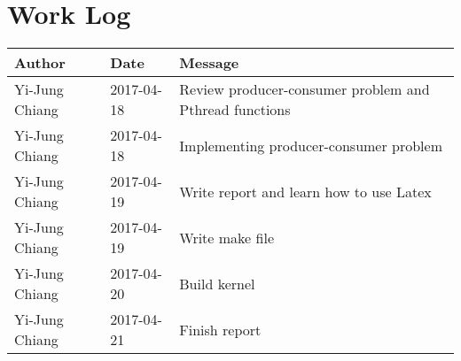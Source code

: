 \documentclass[10pt,conference,draftclsnofoot,onecolumn]{IEEEtran}
\begin{document}
\section{Work Log}

\begin{tabular}{lll} \textbf{Author}
     & \textbf{Date}
     & \textbf{Message}

\\ \hline
Yi-Jung Chiang & 2017-04-18 & Review producer-consumer problem and Pthread functions \\ \hline
Yi-Jung Chiang & 2017-04-18 & Implementing producer-consumer problem \\ \hline
Yi-Jung Chiang & 2017-04-19 & Write report and learn how to use Latex \\ \hline
Yi-Jung Chiang & 2017-04-19 & Write make file\\ \hline
Yi-Jung Chiang & 2017-04-20 & Build kernel\\ \hline
Yi-Jung Chiang & 2017-04-21 & Finish report\\ \hline
\end{tabular}
\end{document}
